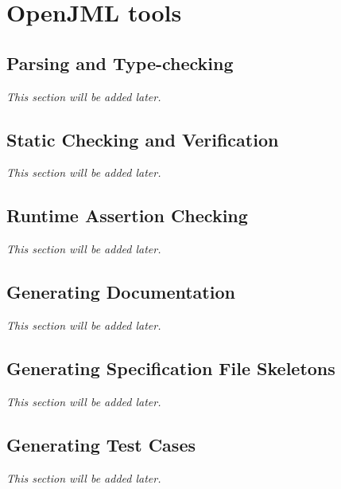 
\chapter{OpenJML tools}

\section{Parsing and Type-checking}
\textit{This section will be added later.} %

\section{Static Checking and Verification}
\textit{This section will be added later.} %

\section{Runtime Assertion Checking}
\textit{This section will be added later.} %

\section{Generating Documentation}
\textit{This section will be added later.} %

\section{Generating Specification File Skeletons}
\textit{This section will be added later.} %

\section{Generating Test Cases}
\textit{This section will be added later.} %